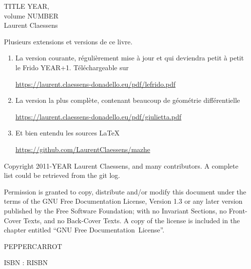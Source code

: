 \documentclass[a4paper,twoside,11pt]{book}
\begin{document}
\pagestyle{empty}

\phantom{Foo}
\newpage

\phantom{Foo}
\newpage

\begin{center}
	TITLE YEAR, \\
	volume NUMBER \\
	Laurent Claessens
\end{center}

\newpage

Plusieurs extensions et versions de ce livre.
\begin{enumerate}
	\item
	      La version courante, régulièrement mise à jour et qui deviendra petit à petit le Frido YEAR+1. Téléchargeable sur
	      \begin{center}
		      \url{https://laurent.claessens-donadello.eu/pdf/lefrido.pdf}
	      \end{center}
	\item
	      La version la plus complète, contenant beaucoup de géométrie différentielle
	      \begin{center}
		      \url{https://laurent.claessens-donadello.eu/pdf/giulietta.pdf}
	      \end{center}
	\item
	      Et bien entendu les sources \LaTeX\
	      \begin{center}
		      \url{https://github.com/LaurentClaessens/mazhe}
	      \end{center}
\end{enumerate}

\newpage

\phantom{un foobar bleuté}

\vfill

\begin{center}
	Copyright 2011-YEAR  Laurent Claessens, and many contributors. A complete list could be retrieved from the git log.

	Permission is granted to copy, distribute and/or modify this document under the terms of the GNU Free Documentation License, Version 1.3 or any later version published by the Free Software Foundation; with no Invariant Sections, no Front-Cover Texts, and no Back-Cover Texts. A copy of the license is included in the chapter entitled ``GNU Free Documentation~License''.
\end{center}

\begin{center}
	PEPPERCARROT
\end{center}

\begin{center}
	ISBN : RISBN
\end{center}
\end{document}
